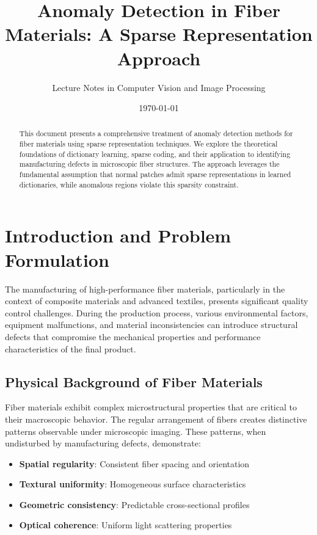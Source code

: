 \documentclass[12pt]{article}
\title{\textbf{Anomaly Detection in Fiber Materials: A Sparse Representation Approach}}
\author{Lecture Notes in Computer Vision and Image Processing}
\date{\today}
\begin{document}
\maketitle

\begin{abstract}
    This document presents a comprehensive treatment of anomaly detection methods for fiber materials using sparse representation techniques. We explore the theoretical foundations of dictionary learning, sparse coding, and their application to identifying manufacturing defects in microscopic fiber structures. The approach leverages the fundamental assumption that normal patches admit sparse representations in learned dictionaries, while anomalous regions violate this sparsity constraint.
\end{abstract}

\tableofcontents
\newpage

\section{Introduction and Problem Formulation}
\label{sec:introduction}

The manufacturing of high-performance fiber materials, particularly in the context of composite materials and advanced textiles, presents significant quality control challenges. During the production process, various environmental factors, equipment malfunctions, and material inconsistencies can introduce structural defects that compromise the mechanical properties and performance characteristics of the final product.

\subsection{Physical Background of Fiber Materials}
\label{subsec:fiber_background}

Fiber materials exhibit complex microstructural properties that are critical to their macroscopic behavior. The regular arrangement of fibers creates distinctive patterns observable under microscopic imaging. These patterns, when undisturbed by manufacturing defects, demonstrate:

\begin{itemize}[leftmargin=*]
    \item \textbf{Spatial regularity}: Consistent fiber spacing and orientation
    \item \textbf{Textural uniformity}: Homogeneous surface characteristics
    \item \textbf{Geometric consistency}: Predictable cross-sectional profiles
    \item \textbf{Optical coherence}: Uniform light scattering properties
\end{itemize}
\end{document}
